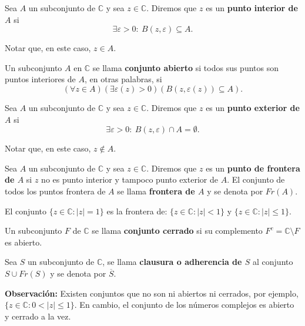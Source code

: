 \begin{defi}
Sea $A$ un subconjunto de $\mathbb{C}$ y sea $z \in \mathbb{C}$. Diremos que $z$ es un \textbf{punto interior de $A$} si 
$$\exists \varepsilon >0 :~ B(z,\varepsilon) \subseteq A.$$

Notar que, en este caso, $z \in A.$
\end{defi}

\begin{defi}
Un subconjunto $A$ en $\mathbb{C}$ se llama \textbf{conjunto abierto} si todos sus puntos son puntos interiores de $A$, en otras palabras, si
$$(\forall z \in A)(\exists \varepsilon(z) >0)(B(z, \varepsilon(z)) \subseteq A).$$
\end{defi}

\begin{defi}
Sea $A$ un subconjunto de $\mathbb{C}$ y sea $z \in \mathbb{C}$. Diremos que $z$ es un \textbf{punto exterior de $A$} si
$$\exists \varepsilon >0 :~ B(z,\varepsilon) \cap A = \emptyset.$$

Notar que, en este caso, $z \notin A$.
\end{defi}

\begin{defi}
Sea $A$ un subconjunto de $\mathbb{C}$ y sea $z \in \mathbb{C}$. Diremos que $z$ es un \textbf{punto de frontera de $A$} si $z$ no es punto interior y tampoco punto exterior de $A$. El conjunto de todos los puntos frontera de $A$ se llama \textbf{frontera de $A$} y se denota por $Fr(A)$. 
\end{defi}

\begin{ejemplo}
El conjunto $\{z \in \mathbb{C} : |z| = 1\}$ es la frontera de: $\{z \in \mathbb{C} : |z|<1\}$ y $\{z \in \mathbb{C} : |z|\leq 1\}$.
\end{ejemplo}

\begin{defi}
Un subconjunto $F$ de $\mathbb{C}$ se llama \textbf{conjunto  cerrado} si su complemento $F^c = \mathbb{C} \setminus F$ es abierto.
\end{defi}

\begin{defi}
Sea $S$ un subconjunto de $\mathbb{C}$, se llama \textbf{clausura o adherencia de $S$} al conjunto $S \cup Fr(S)$ y se denota por $\overline{S}$.
\end{defi}

\textbf{Observación:} Existen conjuntos que no son ni abiertos ni cerrados, por ejemplo, $\{z \in \mathbb{C} : 0 < |z| \leq 1\}$. En cambio, el conjunto de los números complejos es abierto y cerrado a la vez.

